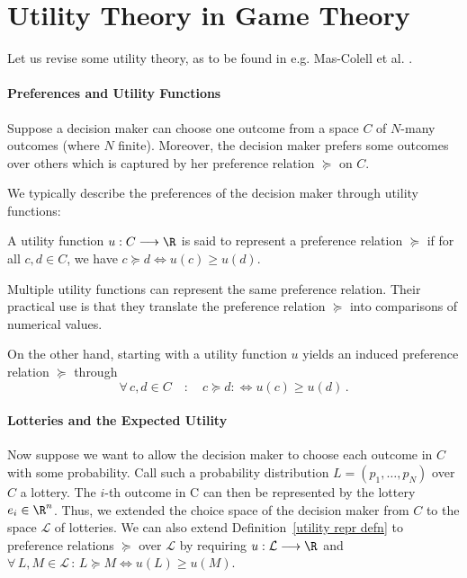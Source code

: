 


\section{Utility Theory in Game Theory}
\label{sec:utility_theory}

Let us revise some utility theory, as to be found in e.g. Mas-Colell et al. \cite{MasCol}.

\paragraph{Preferences and Utility Functions} Suppose a decision maker can choose one outcome from a space $C$ of $N$-many outcomes (where $N$ finite). Moreover, the decision maker prefers some outcomes over others which is captured by her preference relation $\succeq$ on $C$.

We typically describe the preferences of the decision maker through utility functions:
\begin{defn}
\label{utility repr defn}
A utility function $u : C \longrightarrow \R$ is said to represent a preference relation $\succeq$ if for all $c,d \in C$, we have $c \succeq d \iff u(c) \geq u(d)$.
\end{defn}
Multiple utility functions can represent the same preference relation. Their practical use is that they translate the preference relation $\succeq$ into comparisons of numerical values.

On the other hand, starting with a utility function $u$ yields an induced preference relation $\succeq$ through
\[ \forall \, c,d \in C \quad :  \quad c \succeq d :\iff u(c) \geq u(d) \, . \] 

\paragraph{Lotteries and the Expected Utility}

Now suppose we want to allow the decision maker to choose each outcome in $C$ with some probability. Call such a probability distribution $L = (p_1,\ldots,p_N)$ over $C$ a lottery. The $i$-th outcome in C can then be represented by the lottery $e_i \in \R^n$. Thus, we extended the choice space of the decision maker from $C$ to the space $\mathcal{L}$ of lotteries. We can also extend Definition~\ref{utility repr defn} to preference relations $\succeq$ over $\mathcal{L}$ by requiring $u : \mathcal{L} \longrightarrow \R$ and $\forall \, L,M \in \mathcal{L} \, : \, L \succeq M \iff u(L) \geq u(M)$.

